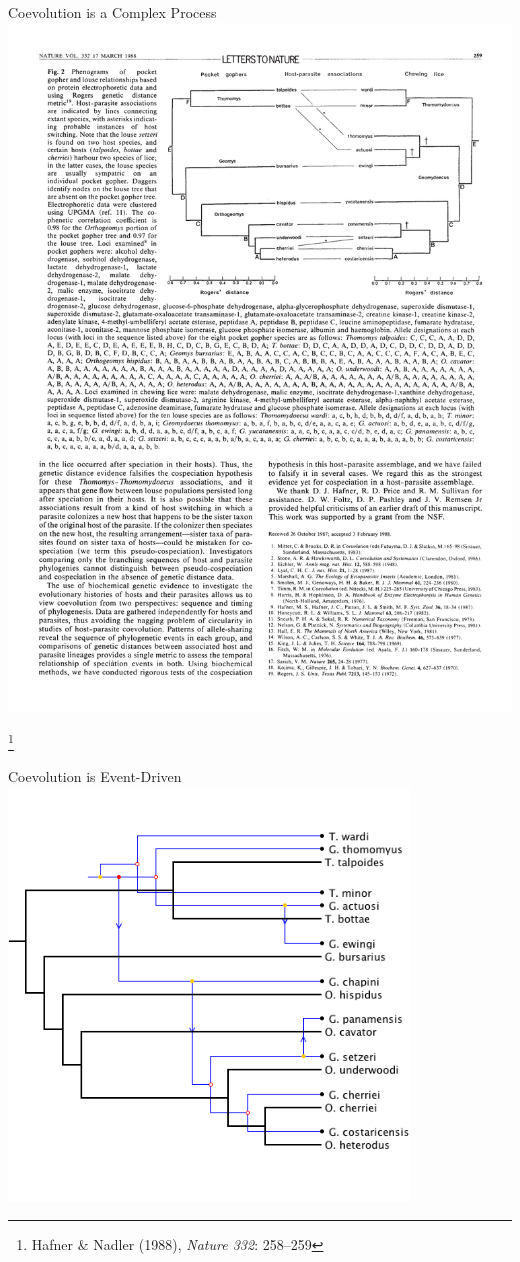 \documentclass{beamer}
\newcommand\blfootnote[1]{
  \begingroup
  \renewcommand\thefootnote{}\footnote{#1}
  \addtocounter{footnote}{-1}
  \endgroup
}
\begin{document}
\begin{frame}{Coevolution is a Complex Process}
\centering
\includegraphics[width=\textwidth]{figures/gopher-louse.pdf}

\blfootnote{Hafner \& Nadler (1988), \emph{Nature 332}: 258--259}
\end{frame}

\begin{frame}{Coevolution is Event-Driven}
\vspace{-0.2in}
\centering
\includegraphics[width=0.8\textwidth]{figures/jane1.png}

\end{frame}
\end{document}
